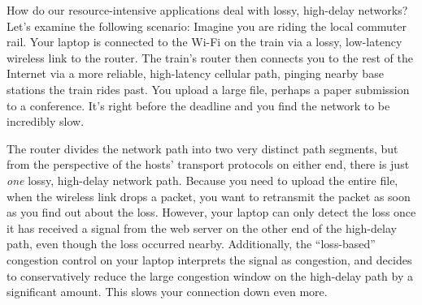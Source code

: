 



How do our resource-intensive applications deal with lossy, high-delay networks?
Let's examine the following scenario: Imagine you are riding the local commuter
rail. Your laptop is connected to the Wi-Fi on the train via a lossy,
low-latency wireless link to the router. The train's router then connects you
to the rest of the Internet via a more reliable, high-latency cellular path,
pinging nearby base stations the train rides past. You upload a large file,
perhaps a paper submission to a conference. It's right before the deadline
and you find the network to be incredibly slow.

The router divides the network path into two very distinct path segments, but
from the perspective of the hosts' transport protocols on either end, there is
just \textit{one} lossy, high-delay network path. Because you need to upload
the entire file, when the wireless link drops a packet, you want to retransmit
the packet as soon as you find out about the loss. However, your laptop can
only detect the loss once it has received a signal from the web server on the
other end of the high-delay path, even though the loss occurred nearby.
Additionally, the ``loss-based'' congestion control on your laptop interprets
the signal as congestion, and decides to conservatively reduce the large
congestion window on the high-delay path by a significant amount. This slows
your connection down even more.

